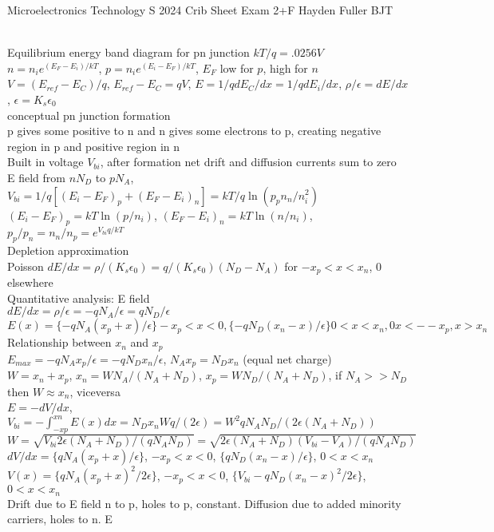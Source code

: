 \documentclass{article}
\begin{document}
Microelectronics Technology S 2024 Crib Sheet Exam 2+F Hayden Fuller BJT
\begin{large}
\\Equilibrium energy band diagram for pn junction $kT/q=.0256V$
\\$n=n_i e^{(E_F-E_i)/kT}$, $p=n_i e^{(E_i-E_F)/kT}$, $E_F$ low for $p$, high for $n$
\\$V=(E_{ref}-E_C)/q$, $E_{ref}-E_C=qV$, $E=1/q dE_C/dx=1/q dE_i/dx$, $\rho/\epsilon=dE/dx$, $\epsilon=K_s\epsilon_0$
\\conceptual pn junction formation
\\p gives some positive to n and n gives some electrons to p, creating negative region in p and positive region in n
\\Built in voltage $V_{bi}$, after formation net drift and diffusion currents sum to zero
\\E field from $n N_D$ to $p N_A$, $V_{bi}=1/q [(E_i-E_F)_p + (E_F-E_i)_n]=kT/q\ln(p_pn_n/n_i^2)$
\\$(E_i-E_F)_p=kT\ln(p/n_i)$, $(E_F-E_i)_n=kT\ln(n/n_i)$, $p_p/p_n=n_n/n_p=e^{V_{bi} q/kT}$
\\Depletion approximation 
\\Poisson $dE/dx=\rho/(K_s\epsilon_0)=q/(K_s\epsilon_0) (N_D-N_A)$ for $-x_p<x<x_n$, $0$ elsewhere
\\Quantitative analysis: E field
\\$dE/dx=\rho/\epsilon=-qN_A/\epsilon=qN_D/\epsilon$
\\$E(x)=\{-qN_A(x_p+x)/\epsilon\} -x_p<x<0, \{-qN_D(x_n-x)/\epsilon\} 0<x<x_n, {0} x<--x_p, x>x_n$
\\Relationship between $x_n$ and $x_p$
\\$E_{max}=-qN_Ax_p/\epsilon=-qN_Dx_n/\epsilon$, $N_Ax_p=N_Dx_n$ (equal net charge)
\\$W=x_n+x_p$, $x_n=W N_A/(N_A+N_D)$, $x_p=W N_D/(N_A+N_D)$, if $N_A>>N_D$ then $W\approx x_n$, viceversa
\\$E=-dV/dx$, $V_{bi}=-\int_{-xp}^{xn} E(x) dx=N_Dx_nWq/(2\epsilon)=W^2qN_AN_D/(2\epsilon (N_A+N_D))$
\\$W=\sqrt{V_{bi}2\epsilon(N_A+N_D)/(qN_AN_D)}=\sqrt{2\epsilon(N_A+N_D)(V_{bi}-V_A)/(qN_AN_D)}$
\\$dV/dx=\{qN_A(x_p+x)/\epsilon\}$, $-x_p<x<0$, $\{qN_D(x_n-x)/\epsilon\}$, $0<x<x_n$
\\$V(x)=\{qN_A(x_p+x)^2/2\epsilon\}$, $-x_p<x<0$, $\{V_{bi}-qN_D(x_n-x)^2/2\epsilon\}$, $0<x<x_n$
\\Drift due to E field n to p, holes to p, constant. Diffusion due to added minority carriers, holes to n. E

\end{large}
\end{document}
